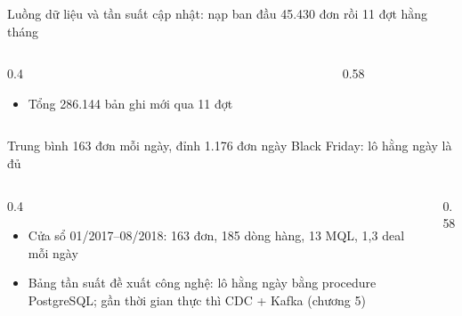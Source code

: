 \begin{frame}{Luồng dữ liệu và tần suất cập nhật: nạp ban đầu 45.430 đơn rồi 11 đợt hằng tháng}
\begin{columns}[T]\begin{column}{0.4\textwidth}
\begin{itemize}
  \item Tổng 286.144 bản ghi mới qua 11 đợt
\end{itemize}
\end{column}\begin{column}{0.58\textwidth}
\begin{center}\end{center}
\end{column}\end{columns}

\end{frame}

\begin{frame}{Trung bình 163 đơn mỗi ngày, đỉnh 1.176 đơn ngày Black Friday: lô hằng ngày là đủ}
\begin{columns}[T]\begin{column}{0.4\textwidth}
\begin{itemize}
  \item Cửa sổ 01/2017--08/2018: 163 đơn, 185 dòng hàng, 13 MQL, 1,3 deal mỗi ngày
  \item Bảng tần suất đề xuất công nghệ: lô hằng ngày bằng procedure PostgreSQL; gần thời gian thực thì CDC + Kafka (chương 5)
\end{itemize}
\end{column}\begin{column}{0.58\textwidth}
\begin{center}\end{center}
\end{column}\end{columns}

\end{frame}

